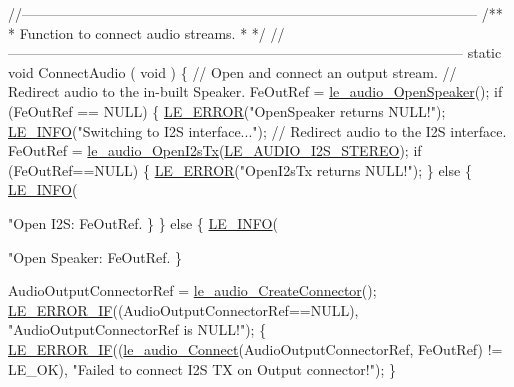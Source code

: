 \begin{DoxyCodeInclude}
{{{\textcolor{comment}{//--------------------------------------------------------------------------------------------------}\textcolor{comment}{}
\textcolor{comment}{/**}
\textcolor{comment}{ * Function to connect audio streams.}
\textcolor{comment}{ *}
\textcolor{comment}{ */}
\textcolor{comment}{//--------------------------------------------------------------------------------------------------}
\textcolor{keyword}{static} \textcolor{keywordtype}{void} ConnectAudio
(
    \textcolor{keywordtype}{void}
)
\{
    \textcolor{comment}{// Open and connect an output stream.}
    \textcolor{comment}{// Redirect audio to the in-built Speaker.}
    FeOutRef = \hyperlink{le__audio__interface_8h_a5c19afce44021c4abf6193707317f8de}{le\_audio\_OpenSpeaker}();
    \textcolor{keywordflow}{if} (FeOutRef == NULL)
    \{
        \hyperlink{le__log_8h_a353590f91b3143a7ba3a416ae5a50c3d}{LE\_ERROR}(\textcolor{stringliteral}{"OpenSpeaker returns NULL!"});
        \hyperlink{le__log_8h_a23e6d206faa64f612045d688cdde5808}{LE\_INFO}(\textcolor{stringliteral}{"Switching to I2S interface..."});
        \textcolor{comment}{// Redirect audio to the I2S interface.}
        FeOutRef = \hyperlink{le__audio__interface_8h_a2633c1368adf60e342d7cadbbfa6278b}{le\_audio\_OpenI2sTx}(\hyperlink{le__audio__interface_8h_a94794180ed71a84bd26a1f525858f252a6ce77f5f956b203e15f662900a5103dd}{LE\_AUDIO\_I2S\_STEREO});
        \textcolor{keywordflow}{if} (FeOutRef==NULL)
        \{
            \hyperlink{le__log_8h_a353590f91b3143a7ba3a416ae5a50c3d}{LE\_ERROR}(\textcolor{stringliteral}{"OpenI2sTx returns NULL!"});
        \}
        \textcolor{keywordflow}{else}
        \{
            \hyperlink{le__log_8h_a23e6d206faa64f612045d688cdde5808}{LE\_INFO}(\textcolor{stringliteral}{"Open I2S: FeOutRef.%
        \}
    \}
    \textcolor{keywordflow}{else}
    \{
        \hyperlink{le__log_8h_a23e6d206faa64f612045d688cdde5808}{LE\_INFO}(\textcolor{stringliteral}{"Open Speaker: FeOutRef.%
    \}

    AudioOutputConnectorRef = \hyperlink{le__audio__interface_8h_a570aaf85086f00aca592acfbaaa237be}{le\_audio\_CreateConnector}();
    \hyperlink{le__log_8h_aceaf11a11691d6c676e36dd317b38dbd}{LE\_ERROR\_IF}((AudioOutputConnectorRef==NULL), \textcolor{stringliteral}{"AudioOutputConnectorRef is NULL!"});
    \{
        \hyperlink{le__log_8h_aceaf11a11691d6c676e36dd317b38dbd}{LE\_ERROR\_IF}((\hyperlink{le__audio__interface_8h_a338df65b2fb1ae0140d86880adbcf0de}{le\_audio\_Connect}(AudioOutputConnectorRef, FeOutRef) != 
      LE\_OK),
                    \textcolor{stringliteral}{"Failed to connect I2S TX on Output connector!"});
    \}

}}}}}
\end{DoxyCodeInclude}
